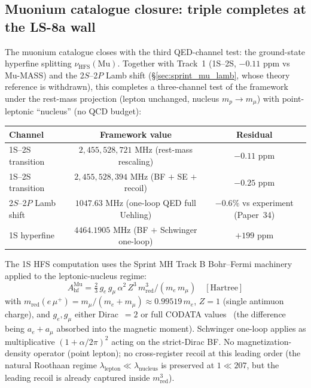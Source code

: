 \documentclass[11pt]{article}
\begin{document}
\subsection{Muonium catalogue closure: triple completes at the LS-8a wall}
\label{sec:muonium_triple_closure}

The muonium catalogue closes with the third QED-channel test: the
ground-state hyperfine splitting $\nu_\text{HFS}(\text{Mu})$.  Together
with Track~1 (1S--2S, $-0.11$ ppm vs Mu-MASS) and the 2$S$--2$P$ Lamb
shift (\S\ref{sec:sprint_mu_lamb}, whose theory reference is
withdrawn), this completes a three-channel test of the framework
under the rest-mass projection (lepton unchanged, nucleus
$m_p \to m_\mu$) with point-leptonic ``nucleus'' (no QCD budget):

\begin{center}
\begin{tabular}{lcc}
\toprule
Channel & Framework value & Residual \\
\midrule
1S--2S transition  & $2{,}455{,}528{,}721$ MHz (rest-mass rescaling) & $-0.11$ ppm \\
1S--2S transition  & $2{,}455{,}528{,}394$ MHz (BF $+$ SE $+$ recoil) & $-0.25$ ppm \\
2$S$--2$P$ Lamb shift & $1047.63$ MHz (one-loop QED full Uehling) & $-0.6\%$ vs experiment (Paper~34) \\
1S hyperfine & $4464.1905$ MHz (BF $+$ Schwinger one-loop) & $+199$ ppm \\
\bottomrule
\end{tabular}
\end{center}

The 1S HFS computation uses the Sprint MH Track B Bohr--Fermi machinery
applied to the leptonic-nucleus regime:
\begin{equation}
A_\text{hf}^\text{Mu}
= \tfrac{2}{3}\, g_e\, g_\mu\, \alpha^2\, Z^3\, m_\text{red}^3
  / (m_e\, m_\mu)\quad [\text{Hartree}]
\label{eq:mu_hfs_bf}
\end{equation}
with $m_\text{red}(e\,\mu^+) = m_\mu / (m_e + m_\mu) \approx
0.99519\, m_e$, $Z=1$ (single antimuon charge), and $g_e, g_\mu$ either
Dirac~$=2$ or full CODATA values~\cite{codata2018} (the difference being $a_e + a_\mu$
absorbed into the magnetic moment).  Schwinger one-loop applies as
multiplicative $(1 + \alpha/2\pi)^2$ acting on the strict-Dirac BF.
No magnetization-density operator (point lepton); no cross-register
recoil at this leading order (the natural Roothaan regime
$\lambda_\text{lepton} \ll \lambda_\text{nucleus}$ is preserved at
$1 \ll 207$, but the leading recoil is already captured inside
$m_\text{red}^3$).
\end{document}
